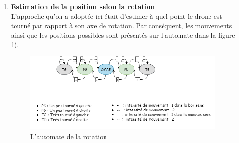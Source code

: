 \documentclass[12pt]{article}
\begin{document}
\begin{enumerate}
        \item \textbf{Estimation de la position selon la rotation }\\
              L’approche qu’on a adoptée ici était d’estimer à quel point le drone est tourné par rapport à son axe de rotation. Par conséquent, les mouvements ainsi que les positions possibles sont présentés sur l’automate dans la figure \ref{fig:image19}).\\
            \begin{figure}[H]
            \centering
            \includegraphics[height=4cm]{image19.png}
            \caption{L'automate de la rotation}
            \label{fig:image19}
            \end{figure}
            

\end{enumerate}
\end{document}
